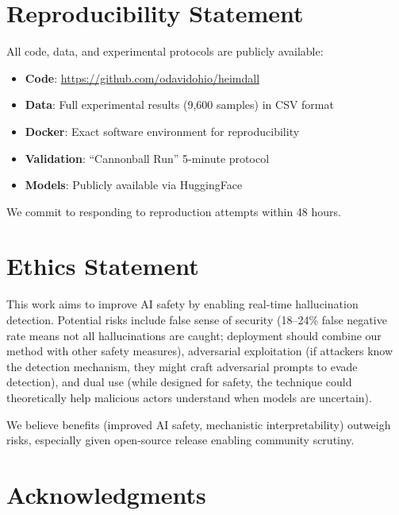 \documentclass[11pt,twocolumn]{article}
\begin{document}
\section{Reproducibility Statement}

All code, data, and experimental protocols are publicly available:

\begin{itemize}
    \item \textbf{Code}: \url{https://github.com/odavidohio/heimdall}
    \item \textbf{Data}: Full experimental results (9,600 samples) in CSV format
    \item \textbf{Docker}: Exact software environment for reproducibility
    \item \textbf{Validation}: ``Cannonball Run'' 5-minute protocol
    \item \textbf{Models}: Publicly available via HuggingFace
\end{itemize}

We commit to responding to reproduction attempts within 48 hours.

\section{Ethics Statement}

This work aims to improve AI safety by enabling real-time hallucination detection. Potential risks include false sense of security (18--24\% false negative rate means not all hallucinations are caught; deployment should combine our method with other safety measures), adversarial exploitation (if attackers know the detection mechanism, they might craft adversarial prompts to evade detection), and dual use (while designed for safety, the technique could theoretically help malicious actors understand when models are uncertain).

We believe benefits (improved AI safety, mechanistic interpretability) outweigh risks, especially given open-source release enabling community scrutiny.

\section*{Acknowledgments}
\end{document}
